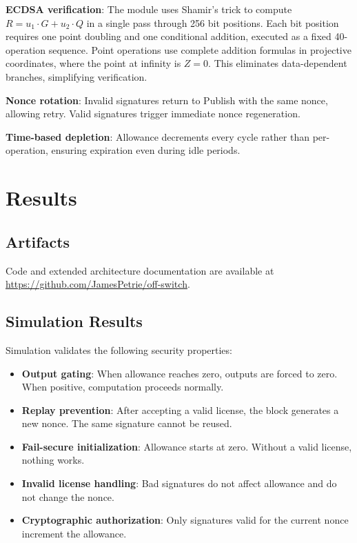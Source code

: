\documentclass[11pt]{article}
\begin{document}
\textbf{ECDSA verification}: The module uses Shamir's trick to compute $R = u_1 \cdot G + u_2 \cdot Q$ in a single pass through 256 bit positions. Each bit position requires one point doubling and one conditional addition, executed as a fixed 40-operation sequence. Point operations use complete addition formulas \cite{renes2016} in projective coordinates, where the point at infinity is $Z = 0$. This eliminates data-dependent branches, simplifying verification.

\textbf{Nonce rotation}: Invalid signatures return to Publish with the same nonce, allowing retry. Valid signatures trigger immediate nonce regeneration.

\textbf{Time-based depletion}: Allowance decrements every cycle rather than per-operation, ensuring expiration even during idle periods.

\section{Results}

\subsection{Artifacts}

Code and extended architecture documentation are available at \url{https://github.com/JamesPetrie/off-switch}.

\subsection{Simulation Results}

Simulation validates the following security properties:

\begin{itemize}[nosep]
    \item \textbf{Output gating}: When allowance reaches zero, outputs are forced to zero. When positive, computation proceeds normally.
    \item \textbf{Replay prevention}: After accepting a valid license, the block generates a new nonce. The same signature cannot be reused.
    \item \textbf{Fail-secure initialization}: Allowance starts at zero. Without a valid license, nothing works.
    \item \textbf{Invalid license handling}: Bad signatures do not affect allowance and do not change the nonce.
    \item \textbf{Cryptographic authorization}: Only signatures valid for the current nonce increment the allowance.
\end{itemize}
\end{document}
